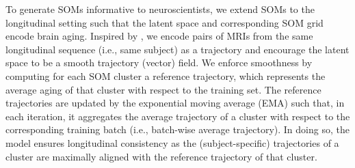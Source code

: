 \documentclass[runningheads]{llncs}
\begin{document}
To generate SOMs informative to neuroscientists, we extend SOMs to the longitudinal setting such that the latent space and corresponding SOM grid encode brain aging. Inspired by \cite{ouyang2021self}, we encode pairs of MRIs from the same longitudinal sequence (i.e., same subject) as a trajectory and encourage the latent space to be a smooth trajectory (vector) field. We enforce smoothness by computing for each SOM cluster a reference trajectory, which represents the average aging of that cluster with respect to the training set. The reference trajectories are updated by the exponential moving average (EMA) such that, in each iteration, it aggregates the average trajectory of a cluster with respect to the corresponding training batch (i.e., batch-wise average trajectory). In doing so, the model ensures longitudinal consistency as the (subject-specific) trajectories of a cluster are maximally aligned with the reference trajectory of that cluster.
\end{document}
